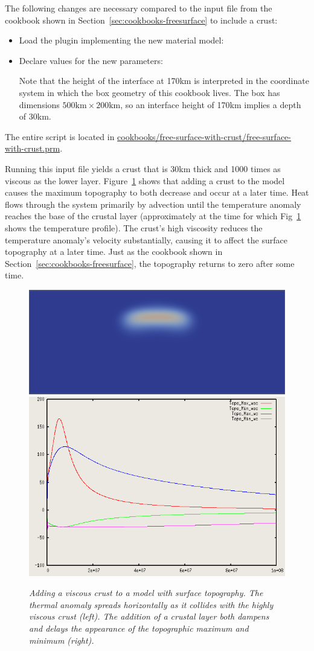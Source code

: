 \documentclass{article}
\begin{document}
The following changes are necessary compared to the input file from the
cookbook shown in Section~\ref{sec:cookbooks-freesurface} to include a crust:
\begin{itemize}
  \item Load the plugin implementing the new material model:
  
  
  \item Declare values for the new parameters:
  
  Note that the height of the interface at 170km is interpreted in the
  coordinate system in which the box geometry of this cookbook lives. The box
  has dimensions $500\text{km}\times 200\text{km}$, so an interface height of
  170km implies a depth of 30km.
\end{itemize}

The entire script is located in
\url{cookbooks/free-surface-with-crust/free-surface-with-crust.prm}.

Running this input file yields a
crust that is 30km thick and 1000 times as viscous as the lower layer.
Figure~\ref{fig:freesurfaceWC} shows that adding a crust to the model causes the maximum topography to both decrease and occur at a later time.
Heat flows through the system primarily by advection until the temperature anomaly reaches the base of the
crustal layer (approximately at the time for which Fig~\ref{fig:freesurfaceWC}
shows the temperature profile).
The crust's high viscosity reduces the temperature anomaly's velocity
substantially, causing it to affect the surface topography at a later time. Just
as the cookbook shown in Section~\ref{sec:cookbooks-freesurface}, the
topography returns to zero after some time.

\begin{figure}
  \centering
  \includegraphics[height=0.25\textwidth]{cookbooks/free_surface_with_crust/free-surfaceWC.png}
  \hfill
  \includegraphics[height=0.25\textwidth]{cookbooks/free_surface_with_crust/Topography.png}
  \caption{\it Adding a viscous crust to a model with surface topography. The
  thermal anomaly spreads horizontally as it collides with the highly viscous crust (left). The addition of a crustal layer both dampens and delays the appearance of the topographic maximum and minimum (right). }
  \label{fig:freesurfaceWC}
\end{figure}
\end{document}
